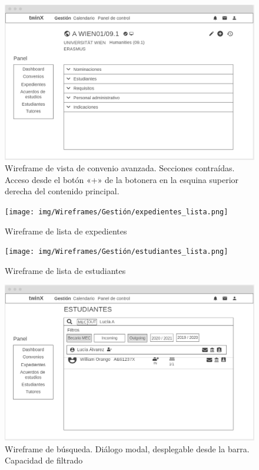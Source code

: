 \begin{figure}
	\centering
	\includegraphics[width=\textwidth]{img/Wireframes/Gestión/vista_convenio_avanzada_contraída.png}
	\caption[Wireframe de vista de convenio avanzada]{Wireframe de vista de convenio avanzada. Secciones contraídas. Acceso desde el botón «+» de la botonera en la esquina superior derecha del contenido principal.}
	\label{fig:vista_conv_avanzada_contWF}
\end{figure}

\begin{figure}
	\centering
	\texttt{[image: img/Wireframes/Gestión/expedientes\_lista.png]}
	\caption{Wireframe de lista de expedientes}
	\label{fig:expedientes_listaWF}
\end{figure}

\begin{figure}
	\centering
	\texttt{[image: img/Wireframes/Gestión/estudiantes\_lista.png]}
	\caption{Wireframe de lista de estudiantes}
	\label{fig:estudiantes_listaWF}
\end{figure}

\begin{figure}
	\centering
	\includegraphics[width=\textwidth]{img/Wireframes/Gestión/búsqueda.png}
	\caption[Wireframe de búsqueda]{Wireframe de búsqueda. Diálogo modal, desplegable desde la barra. Capacidad de filtrado}
	\label{fig:búsquedaWF}
\end{figure}

